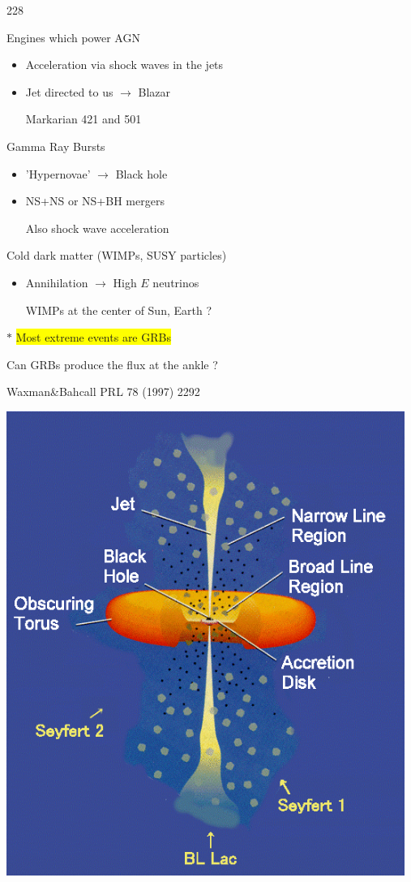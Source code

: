\Tr
\begin{dinglist}{228}
\item Engines which power AGN
\begin{itemize}
\item Acceleration via shock waves in the jets
\item Jet directed to us $\rightarrow$ Blazar
\item[] Markarian 421 and 501
\end{itemize}
\item Gamma Ray Bursts
\begin{itemize}
\item 'Hypernovae' $\rightarrow$ Black hole
\item NS+NS or NS+BH mergers
\item[] {\blue Also shock wave acceleration}
\end{itemize}
\item Cold dark matter (WIMPs, SUSY particles)
\begin{itemize}
\item Annihilation $\rightarrow$ {\blue High $E$ neutrinos}
\item[] {\red WIMPs at the center of Sun, Earth ?}
\end{itemize}
\item[$\ast$] \colorbox{yellow}{Most extreme events are GRBs}
\item[] {\blue Can GRBs produce the flux at the ankle ?}
\item[] Waxman\&Bahcall PRL 78 (1997) 2292
\end{dinglist}

\newpage

\begin{center}
\includegraphics[keepaspectratio,width=13cm]{agn-1}
\end{center}

